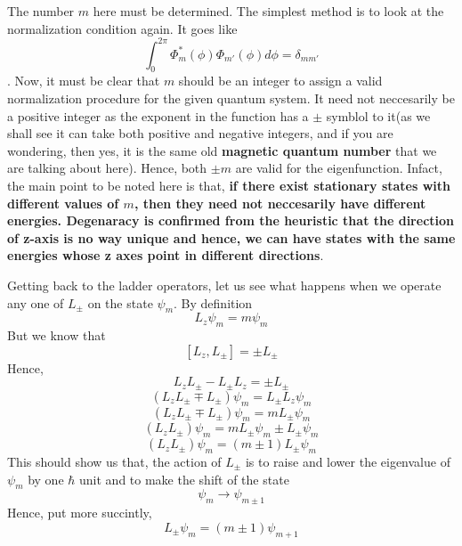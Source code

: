 \documentclass[12pt]{article}
\begin{document}
The number $m$ here must be determined. The simplest method is to look at the normalization condition again. It goes like $$\int_0^{2\pi} \Phi_m^*(\phi)\Phi_{m'}(\phi) d\phi = \delta_{mm'}$$. Now, it must be clear that $m$ should be an integer to assign a valid normalization procedure for the given quantum system. It need not neccesarily be a positive integer as the exponent in the function has a $\pm$ symblol to it(as we shall see it can take both positive and negative integers, and if you are wondering, then yes, it is the same old \textbf{magnetic quantum number} that we are talking about here). Hence, both $\pm m$ are valid for the eigenfunction. Infact, the main point to be noted here is that, \textbf{if there exist stationary states with different values of $m$, then they need not neccesarily have different energies. Degenaracy is confirmed from the heuristic that the direction of z-axis is no way unique and hence, we can have states with the same energies whose z axes point in different directions}.

Getting back to the ladder operators, let us see what happens when we operate any one of $L_{\pm}$ on the state $\psi_m$. By definition $$L_z\psi_m = m\psi_m$$ But we know that $$[L_z, L_{\pm}] = \pm L_{\pm}$$ Hence,
$$L_zL_{\pm} - L_{\pm}L_z = \pm L_{\pm}$$
$$(L_zL_{\pm} \mp L_{\pm})\psi_m = L_{\pm}L_z\psi_m$$ 
$$(L_zL_{\pm} \mp L_{\pm})\psi_m = mL_{\pm}\psi_m$$
$$(L_zL_{\pm})\psi_m  = mL_{\pm}\psi_m\pm L_{\pm}\psi_m$$
$$(L_zL_{\pm})\psi_m = (m \pm 1)L_{\pm}\psi_m$$
This should show us that, the action of $L_{\pm}$ is to raise and lower the eigenvalue of $\psi_m$ by one $\hbar$ unit and to make the shift of the state $$\psi_m \to \psi_{m \pm 1}$$ Hence, put more succintly, $$L_{\pm}\psi_m = (m \pm 1)\psi_{m+1}$$
\end{document}
